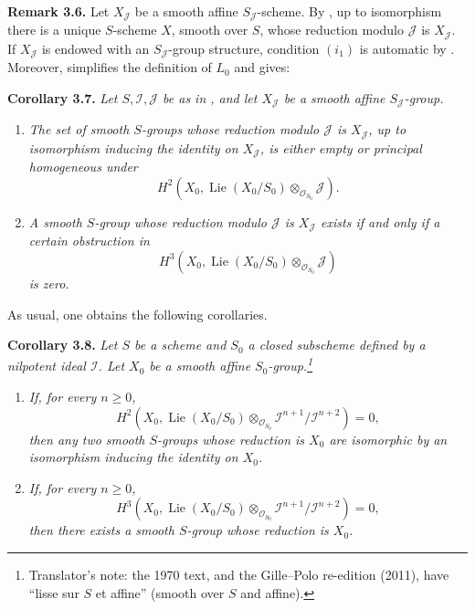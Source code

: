 \medskip
\noindent{}\textbf{Remark 3.6.}
Let \(X_{\mathscr J}\) be a smooth affine \(S_{\mathscr J}\)-scheme.
By , up to isomorphism there is a unique \(S\)-scheme \(X\), smooth
over \(S\), whose reduction modulo \(\mathscr J\) is
\(X_{\mathscr J}\). If \(X_{\mathscr J}\) is endowed with an
\(S_{\mathscr J}\)-group structure, condition \((i_1)\) is automatic
by . Moreover,  simplifies the definition of \(L_0\) and gives:

\medskip
\noindent{}\textbf{Corollary 3.7.}
\textit{Let \(S,\mathscr I,\mathscr J\) be as in , and let
\(X_{\mathscr J}\) be a smooth affine \(S_{\mathscr J}\)-group.}
\begin{enumerate}
\item[(i)] \textit{The set of smooth \(S\)-groups whose reduction
modulo \(\mathscr J\) is \(X_{\mathscr J}\), up to isomorphism
inducing the identity on \(X_{\mathscr J}\), is either empty or
principal homogeneous under}
\[
 H^2\!\left(
  X_0,\operatorname{Lie}(X_0/S_0)
  \otimes_{\mathscr O_{S_0}}\mathscr J
 \right).
\]
\item[(ii)] \textit{A smooth \(S\)-group whose reduction modulo
\(\mathscr J\) is \(X_{\mathscr J}\) exists if and only if a certain
obstruction in}
\[
 H^3\!\left(
  X_0,\operatorname{Lie}(X_0/S_0)
  \otimes_{\mathscr O_{S_0}}\mathscr J
 \right)
\]
\textit{is zero.}
\end{enumerate}

As usual, one obtains the following corollaries.

\medskip
\noindent{}\textbf{Corollary 3.8.}
\textit{Let \(S\) be a scheme and \(S_0\) a closed subscheme defined by
a nilpotent ideal \(\mathscr I\). Let \(X_0\) be a smooth affine
\(S_0\)-group.\footnote{Translator's note: the 1970 text, and the Gille--Polo
re-edition (2011), have ``lisse sur \(S\) et affine'' (smooth over \(S\) and
affine).}}
\begin{enumerate}
\item[(i)] \textit{If, for every \(n\geq0\),}
\[
 H^2\!\left(
  X_0,\operatorname{Lie}(X_0/S_0)
  \otimes_{\mathscr O_{S_0}}
  \mathscr I^{n+1}/\mathscr I^{n+2}
 \right)=0,
\]
\textit{then any two smooth \(S\)-groups whose reduction is \(X_0\)
are isomorphic by an isomorphism inducing the identity on \(X_0\).}
\item[(ii)] \textit{If, for every \(n\geq0\),}
\[
 H^3\!\left(
  X_0,\operatorname{Lie}(X_0/S_0)
  \otimes_{\mathscr O_{S_0}}
  \mathscr I^{n+1}/\mathscr I^{n+2}
 \right)=0,
\]
\textit{then there exists a smooth \(S\)-group whose reduction is
\(X_0\).}
\end{enumerate}

